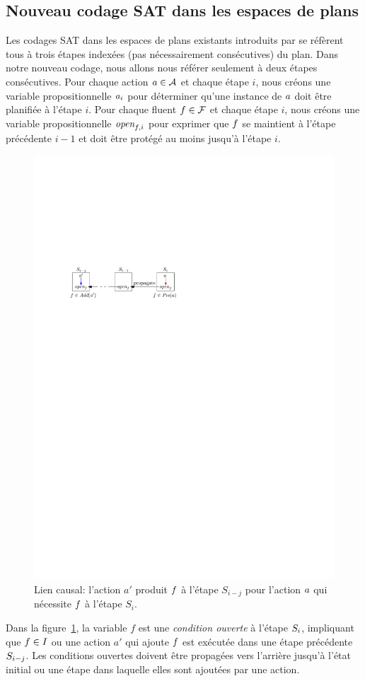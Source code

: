 %
%
\subsection{Nouveau codage SAT dans les espaces de plans}


Les codages SAT dans les espaces de plans existants introduits par \cite{DBLP:conf/aaai/MaliK99} se réfèrent tous à trois étapes indexées (pas nécessairement consécutives) du plan.
Dans notre nouveau codage, nous allons nous référer seulement à deux étapes consécutives.
Pour chaque action $\a\in\A$ et chaque étape $i$, nous créons une variable propositionnelle $\a_{i}$ pour déterminer qu'une instance de $\a$ doit être planifiée à l'étape $i$.
Pour chaque fluent $\f\in\F$ et chaque étape $i$, nous créons une variable propositionnelle $\open{\f}{i}$ pour exprimer que $\f$ se maintient à l'étape précédente $i-1$ et doit être protégé au moins jusqu'à l'étape $i$.

\begin{figure}[hb!]\centering
	\includegraphics[width=.5\textwidth]{figures/transitions}
    \caption{Lien causal: l'action $a'$ produit $\f$ à l'étape $S_{i-j}$ pour l'action $\a$ qui nécessite $\f$ à l'étape $S_{i}$.}
    \label{fig:causal-link-sat}
\end{figure}

Dans la figure~\ref{fig:causal-link-sat}, la variable $f$ est une \textit {condition ouverte} à l'étape $\S_i$, impliquant que $\f\in\I$ ou une action $a'$ qui ajoute $\f$ est exécutée dans une étape précédente $\S_{i-j}$.
Les conditions ouvertes doivent être propagées vers l'arrière jusqu'à l'état initial ou une étape dans laquelle elles sont ajoutées par une action.




